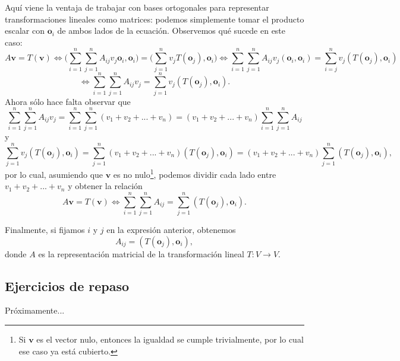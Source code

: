 \documentclass[12pt]{article}
\begin{document}
Aquí viene la ventaja de trabajar con bases ortogonales para representar transformaciones lineales como matrices: podemos simplemente tomar el producto escalar con $\mathbf{o}_i$ de ambos lados de la ecuación. Observemos qué sucede en este caso: \[
    A\mathbf{v}=T(\mathbf{v}) \iff \big (\sum_{i=1}^n \sum_{j=1}^n A_{ij} v_j \mathbf{o}_i, \mathbf{o}_i \big ) = \big ( \sum_{j=1}^n v_j T(\mathbf{o}_j), \mathbf{o}_i ) \iff \sum_{i=1}^n \sum_{j=1}^n A_{ij} v_j (\mathbf{o}_i,\mathbf{o}_i) = \sum_{i=j}^n v_j (T(\mathbf{o}_j),\mathbf{o}_i)
\] \[
\iff \sum_{i=1}^n \sum_{j=1}^n A_{ij} v_j = \sum_{j=1}^n v_j(T(\mathbf{o}_j),\mathbf{o}_i)
.\] \noindent Ahora sólo hace falta observar que \[
\sum_{i=1}^n \sum_{j=1}^n A_{ij} v_j = \sum_{i=1}^n \sum_{j=1}^n (v_1+v_2+...+v_n) = (v_1+v_2+...+v_n)\sum_{i=1}^n\sum_{j=1}^n A_{ij}
\] \noindent y \[
\sum_{j=1}^n v_j (T(\mathbf{o}_j),\mathbf{o}_i) = \sum_{j=1}^n (v_1+v_2+...+v_n) (T(\mathbf{o}_j),\mathbf{o}_i) = (v_1+v_2+...+v_n) \sum_{j=1}^n (T(\mathbf{o}_j), \mathbf{o}_i)
,\] por lo cual, asumiendo que $\mathbf{v}$ es no nulo\footnote{Si $\mathbf{v}$ es el vector nulo, entonces la igualdad se cumple trivialmente, por lo cual ese caso ya está cubierto.}, podemos dividir cada lado entre $v_1+v_2+...+v_n$ y obtener la relación \[
A\mathbf{v}=T(\mathbf{v}) \iff \sum_{i=1}^n \sum_{j=1}^n A_{ij} = \sum_{j=1}^n (T(\mathbf{o}_j),\mathbf{o}_i)
.\] 

Finalmente, si fijamos $i$ y $j$ en la expresión anterior, obtenemos \[
    A_{ij} = (T(\mathbf{o}_j),\mathbf{o}_i)
,\] donde $A$ es la representación matricial de la transformación lineal $T:V\to V$. 

\subsection{Ejercicios de repaso}

Próximamente...
\end{document}

